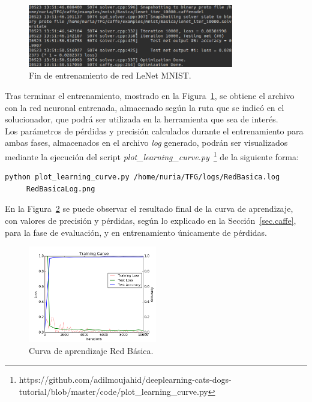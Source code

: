 	\begin{figure}[H]
		\begin{center}
			\includegraphics[width=0.8\textwidth]{figures/RedBasicaFin}
			\caption{Fin de entrenamiento de red LeNet MNIST.}
			\label{fig.finEntrBas}
		\end{center}
	\end{figure}
	
	Tras terminar el entrenamiento, mostrado en la Figura~\ref{fig.finEntrBas}, se obtiene el archivo con la red neuronal entrenada, almacenado según la ruta que se indicó en el solucionador, que podrá ser utilizada en la herramienta que sea de interés.\\

	Los parámetros de pérdidas y precisión calculados durante el entrenamiento para ambas fases, almacenados en el archivo \textit{log} generado, podrán ser visualizados mediante la ejecución del script \textit{plot\_learning\_curve.py}~\footnote{https://github.com/adilmoujahid/deeplearning-cats-dogs-tutorial/blob/master/code/plot\_learning\_curve.py} de la siguiente forma:
	\vspace{10pt}
	\begin{lstlisting}[frame=single]
	python plot_learning_curve.py /home/nuria/TFG/logs/RedBasica.log 
	 RedBasicaLog.png
	\end{lstlisting}
	
	En la Figura~\ref{fig.Log} se puede observar el resultado final de la curva de aprendizaje, con valores de precisión y pérdidas, según lo explicado en la Sección~\ref{sec.caffe}, para la fase de evaluación, y en entrenamiento únicamente de pérdidas.
	
	\begin{figure}[H]
		\begin{center}
			\includegraphics[width=0.5\textwidth]{figures/RedBasicaLog}
			\caption{Curva de aprendizaje Red Básica.}
			\label{fig.Log}
		\end{center}
	\end{figure}

